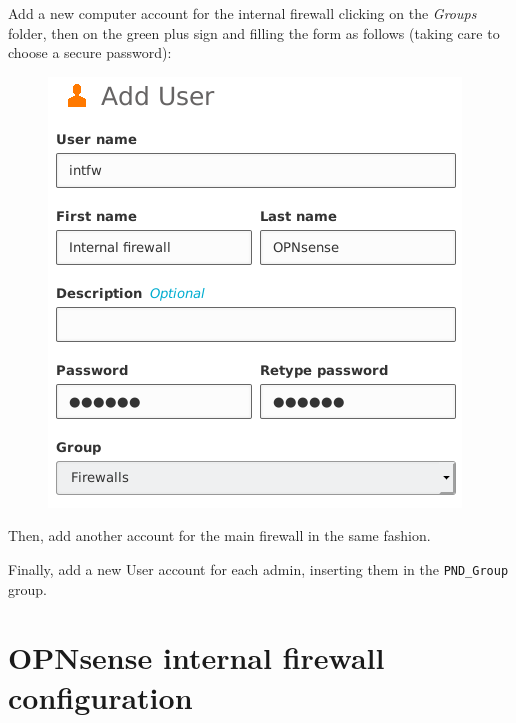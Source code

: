 \documentclass[draft]{homework}
\newcommand{\opn}{OPNsense\xspace}
\begin{document}
    Add a new computer account for the internal firewall clicking on the \textit{Groups} folder, then on the green plus sign and filling the form as follows (taking care to choose a secure password):
    \begin{figure}[H]
        \centering
        \includegraphics[width=\linewidth]{images/intfw}
        \label{fig:group}
    \end{figure}
    \noindent Then, add another account for the main firewall in the same fashion.
    
    Finally, add a new User account for each admin, inserting them in the \texttt{PND\_Group} group.
    
    
    \section{\opn internal firewall configuration}
\end{document}
